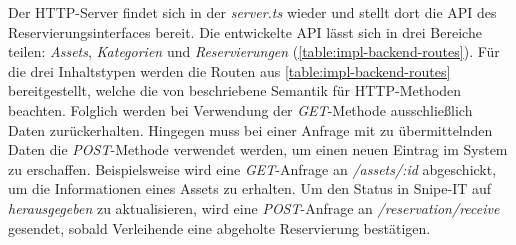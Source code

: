 Der HTTP-Server findet sich in der \textit{server.ts} wieder und stellt dort die API des
Reservierungsinterfaces bereit. Die entwickelte API lässt sich in drei Bereiche teilen:
\textit{Assets}, \textit{Kategorien} und \textit{Reservierungen} (\ref{table:impl-backend-routes}).
Für die drei Inhaltstypen werden die Routen aus \ref{table:impl-backend-routes} bereitgestellt,
welche die von  beschriebene Semantik für HTTP-Methoden beachten.
Folglich werden bei Verwendung der \textit{GET}-Methode ausschließlich Daten zurückerhalten.
Hingegen muss bei einer Anfrage mit zu übermittelnden Daten die \textit{POST}-Methode verwendet
werden, um einen neuen Eintrag im System zu erschaffen. Beispielsweise wird eine
\textit{GET}-Anfrage an \textit{/assets/:id} abgeschickt, um die Informationen eines Assets zu
erhalten. Um den Status in Snipe-IT auf \textit{herausgegeben} zu aktualisieren, wird eine
\textit{POST}-Anfrage an \textit{/reservation/receive} gesendet, sobald Verleihende eine abgeholte
Reservierung bestätigen.

